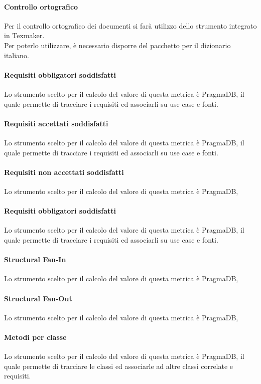 \paragraph{Controllo ortografico}
Per il controllo ortografico dei documenti si farà utilizzo dello strumento integrato in Texmaker.\\
Per poterlo utilizzare, è necessario disporre del pacchetto per il dizionario italiano.

\paragraph{Requisiti obbligatori soddisfatti}
Lo strumento scelto per il calcolo del valore di questa metrica è PragmaDB, il quale permette di tracciare i requisiti ed associarli su use case e fonti.
\paragraph{Requisiti accettati soddisfatti}
Lo strumento scelto per il calcolo del valore di questa metrica è PragmaDB, il quale permette di tracciare i requisiti ed associarli su use case e fonti.
\paragraph{Requisiti non accettati soddisfatti}
Lo strumento scelto per il calcolo del valore di questa metrica è PragmaDB,
\paragraph{Requisiti obbligatori soddisfatti}
Lo strumento scelto per il calcolo del valore di questa metrica è PragmaDB, il quale permette di tracciare i requisiti ed associarli su use case e fonti.
\paragraph{Structural Fan-In}
Lo strumento scelto per il calcolo del valore di questa metrica è PragmaDB,
\paragraph{Structural Fan-Out}
Lo strumento scelto per il calcolo del valore di questa metrica è PragmaDB,
\paragraph{Metodi per classe}
Lo strumento scelto per il calcolo del valore di questa metrica è PragmaDB, il quale permette di tracciare le classi ed associarle ad altre classi correlate e requisiti.

